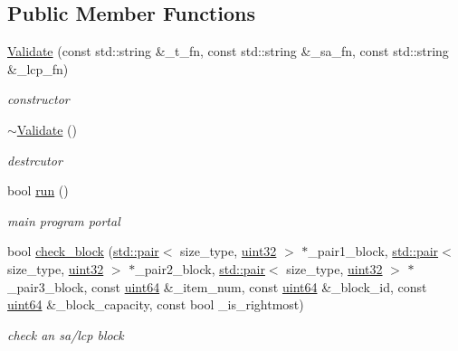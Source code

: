 \subsection*{Public Member Functions}
\begin{DoxyCompactItemize}
\item 
\hyperlink{class_validate_a93b53c001ce92ccad38fe371e9df77b4}{Validate} (const std\+::string \&\+\_\+t\+\_\+fn, const std\+::string \&\+\_\+sa\+\_\+fn, const std\+::string \&\+\_\+lcp\+\_\+fn)
\begin{DoxyCompactList}\small\item\em constructor \end{DoxyCompactList}\item 
\hyperlink{class_validate_a991e319d335c6f666f0058be4f73fc97}{$\sim$\+Validate} ()
\begin{DoxyCompactList}\small\item\em destrcutor \end{DoxyCompactList}\item 
bool \hyperlink{class_validate_ab94f0feab53136b137c432332efa1ff3}{run} ()
\begin{DoxyCompactList}\small\item\em main program portal \end{DoxyCompactList}\item 
bool \hyperlink{class_validate_a3d560deb2bd3e2984f6f3b8b8b766904}{check\+\_\+block} (\hyperlink{tuples_8h_a80f1b898df1006722612d5ecf89cd4d7}{std\+::pair}$<$ size\+\_\+type, \hyperlink{types_8h_a8f95e75e58492e87412191fabadd8ca8}{uint32} $>$ $\ast$\+\_\+pair1\+\_\+block, \hyperlink{tuples_8h_a80f1b898df1006722612d5ecf89cd4d7}{std\+::pair}$<$ size\+\_\+type, \hyperlink{types_8h_a8f95e75e58492e87412191fabadd8ca8}{uint32} $>$ $\ast$\+\_\+pair2\+\_\+block, \hyperlink{tuples_8h_a80f1b898df1006722612d5ecf89cd4d7}{std\+::pair}$<$ size\+\_\+type, \hyperlink{types_8h_a8f95e75e58492e87412191fabadd8ca8}{uint32} $>$ $\ast$\+\_\+pair3\+\_\+block, const \hyperlink{types_8h_a60e8696a4678cd348e991a1f172e53f7}{uint64} \&\+\_\+item\+\_\+num, const \hyperlink{types_8h_a60e8696a4678cd348e991a1f172e53f7}{uint64} \&\+\_\+block\+\_\+id, const \hyperlink{types_8h_a60e8696a4678cd348e991a1f172e53f7}{uint64} \&\+\_\+block\+\_\+capacity, const bool \+\_\+is\+\_\+rightmost)
\begin{DoxyCompactList}\small\item\em check an sa/lcp block \end{DoxyCompactList}\end{DoxyCompactItemize}
